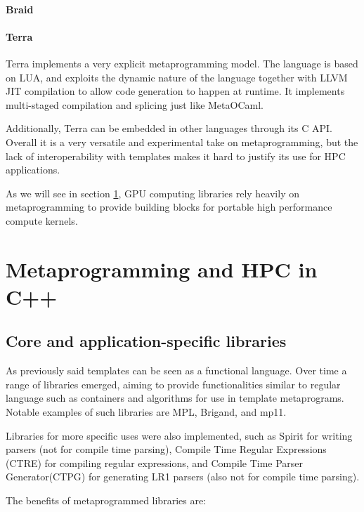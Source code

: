 \documentclass[../main]{subfiles}
\begin{document}
\paragraph{Braid}

\paragraph{Terra}

Terra\cite{terra} implements a very explicit metaprogramming model.
The language is based on LUA, and exploits the dynamic nature of the language
together with LLVM JIT compilation to allow code generation
to happen at runtime.
It implements multi-staged compilation and splicing just like MetaOCaml.

Additionally, Terra can be embedded in other languages through its C API.
Overall it is a very versatile and experimental take on metaprogramming,
but the lack of interoperability with \cpp templates makes it hard to justify
its use for HPC applications.

As we will see in section \ref{lbl:meta-cpp}, GPU computing libraries
rely heavily on \cpp metaprogramming to provide building blocks for
portable high performance compute kernels.

\section{
  Metaprogramming and HPC in C++
}
\label{lbl:meta-cpp}

\subsection{Core and application-specific libraries}

As previously said \cpp templates can be seen as a functional language.
Over time a range of libraries emerged, aiming to provide functionalities
similar to regular language such as containers and algorithms for use in
template metaprograms. Notable examples of such libraries are MPL\cite{mpl},
Brigand\cite{brigand}, and mp11\cite{mp11}.

Libraries for more specific uses were also implemented, such as
Spirit\cite{spirit} for writing parsers (not for compile time parsing),
Compile Time Regular Expressions (CTRE)\cite{ctre}
for compiling regular expressions,
and Compile Time Parser Generator(CTPG)\cite{ctpg}
for generating LR1 parsers (also not for compile time parsing).

The benefits of metaprogrammed libraries are:
\end{document}
